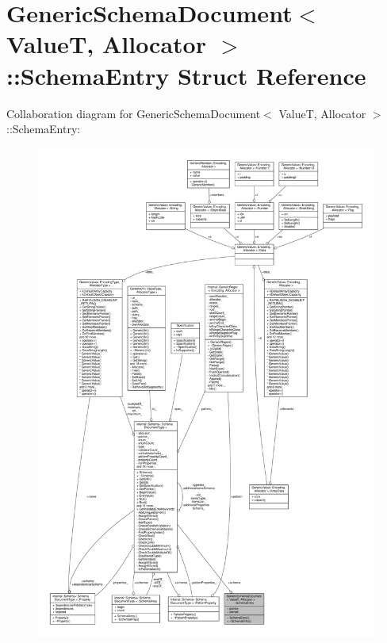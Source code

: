\hypertarget{structGenericSchemaDocument_1_1SchemaEntry}{}\section{Generic\+Schema\+Document$<$ ValueT, Allocator $>$\+:\+:Schema\+Entry Struct Reference}
\label{structGenericSchemaDocument_1_1SchemaEntry}


Collaboration diagram for Generic\+Schema\+Document$<$ ValueT, Allocator $>$\+:\+:Schema\+Entry\+:
\nopagebreak
\begin{figure}[H]
\begin{center}
\leavevmode
\includegraphics[width=350pt]{structGenericSchemaDocument_1_1SchemaEntry__coll__graph}
\end{center}
\end{figure}
